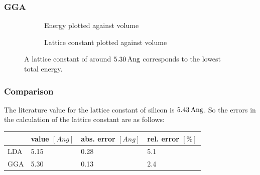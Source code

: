 \documentclass[12pt,a4paper]{scrartcl}
\begin{document}
\subsubsection{GGA}

\begin{figure}[H]
        \begin{subfigure}[a]{\textwidth}
			\resizebox{\linewidth}{!}{}
    		\caption[GGA: energy against volume]{Energy plotted against volume}
		\end{subfigure}
        \begin{subfigure}[a]{\textwidth}
			\resizebox{\linewidth}{!}{}
    		\caption[GGA: lattice constant against volume]{Lattice constant plotted against volume}
		\end{subfigure}
        \caption[Plots to determine the lowest energy lattice constant (GGA)]{A lattice constant of around $\unit[5.30]{Ang}$ corresponds to the lowest total energy.}
        \label{fig:latticeGGA}
\end{figure}

\subsubsection{Comparison}
The literature value for the lattice constant of silicon is $\unit[5.43]{Ang}$. So the errors in the calculation of the lattice constant are as follows:

\begin{table}[H]
\begin{tabular}{l|l|l|l}
  & value $[\unit{Ang}]$ & abs. error $[\unit{Ang}]$ & rel. error $[\unit{\%}]$ \\ 
\hline
LDA & 5.15 & 0.28 & 5.1 \\ 
\hline 
GGA & 5.30 & 0.13 & 2.4 \\  
\end{tabular}
\end{table}
\end{document}
